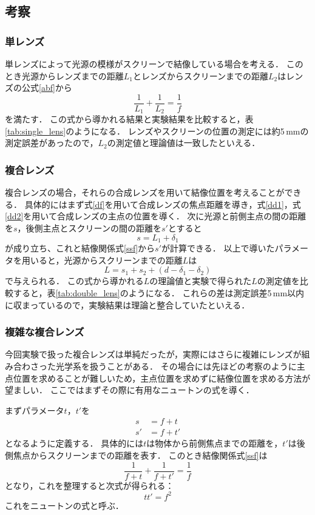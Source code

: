 \documentclass[titlepage]{jsarticle}
\begin{document}
\subsection{考察}
\subsubsection{単レンズ}
単レンズによって光源の模様がスクリーンで結像している場合を考える．
このとき光源からレンズまでの距離$L_1$とレンズからスクリーンまでの距離$L_2$はレンズの公式\eqref{abf}から
\begin{equation}
    \frac{1}{L_1} + \frac{1}{L_2} = \frac{1}{f}
\end{equation}
を満たす．
この式から導かれる結果と実験結果を比較すると，表\ref{tab:single_lens}のようになる．
レンズやスクリーンの位置の測定には約5\,mmの測定誤差があったので，$L_2$の測定値と理論値は一致したといえる．

\subsubsection{複合レンズ}
複合レンズの場合，それらの合成レンズを用いて結像位置を考えることができる．
具体的にはまず式\eqref{df}を用いて合成レンズの焦点距離を導き，式\eqref{dd1}，式\eqref{dd2}を用いて合成レンズの主点の位置を導く．
次に光源と前側主点の間の距離を$s$，後側主点とスクリーンの間の距離を$s'$とすると
\begin{equation}
    s = L_1 + \delta_1
\end{equation}
が成り立ち、これと結像関係式\eqref{ssf}から$s'$が計算できる．
以上で導いたパラメータを用いると，光源からスクリーンまでの距離$L$は
\begin{equation}
    L = s_1 + s_2 + (d - \delta_1 - \delta_2)
\end{equation}
で与えられる．
この式から導かれる$L$の理論値と実験で得られた$L$の測定値を比較すると，表\ref{tab:double_lens}のようになる．
これらの差は測定誤差5\,mm以内に収まっているので，実験結果は理論と整合していたといえる．

\subsubsection{複雑な複合レンズ}
今回実験で扱った複合レンズは単純だったが，実際にはさらに複雑にレンズが組み合わさった光学系を扱うことがある．
その場合には先ほどの考察のように主点位置を求めることが難しいため，主点位置を求めずに結像位置を求める方法が望ましい．
ここではまずその際に有用なニュートンの式を導く．

まずパラメータ$t$，$t'$を
\begin{align}
    s &= f + t \\
    s' &= f + t'
\end{align}
となるように定義する．
具体的には$t$は物体から前側焦点までの距離を，$t'$は後側焦点からスクリーンまでの距離を表す．
このとき結像関係式\eqref{ssf}は
\begin{equation}
    \frac{1}{f+t} + \frac{1}{f+t'} = \frac{1}{f}
\end{equation}
となり，これを整理すると次式が得られる：
\begin{equation}
    tt' = f^2
\end{equation}
これをニュートンの式と呼ぶ．
\end{document}
